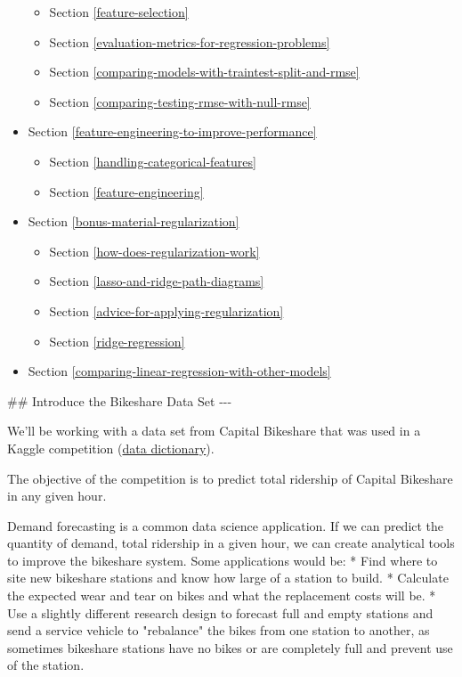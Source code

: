 \documentclass[11pt]{article}
\providecommand{\tightlist}{%
      \setlength{\itemsep}{0pt}\setlength{\parskip}{0pt}}
\begin{document}
\begin{itemize}
  \begin{itemize}
  \tightlist
  \item
    Section \ref{feature-selection}
  \item
    Section \ref{evaluation-metrics-for-regression-problems}
  \item
    Section \ref{comparing-models-with-traintest-split-and-rmse}
  \item
    Section \ref{comparing-testing-rmse-with-null-rmse}
  \end{itemize}
\item
  Section \ref{feature-engineering-to-improve-performance}

  \begin{itemize}
  \tightlist
  \item
    Section \ref{handling-categorical-features}
  \item
    Section \ref{feature-engineering}
  \end{itemize}
\item
  Section \ref{bonus-material-regularization}

  \begin{itemize}
  \tightlist
  \item
    Section \ref{how-does-regularization-work}
  \item
    Section \ref{lasso-and-ridge-path-diagrams}
  \item
    Section \ref{advice-for-applying-regularization}
  \item
    Section \ref{ridge-regression}
  \end{itemize}
\item
  Section \ref{comparing-linear-regression-with-other-models}
\end{itemize}

     \#\# Introduce the Bikeshare Data Set -\/-\/-

    We'll be working with a data set from Capital Bikeshare that was used in
a Kaggle competition
(\href{https://www.kaggle.com/c/bike-sharing-demand/data}{data
dictionary}).

The objective of the competition is to predict total ridership of
Capital Bikeshare in any given hour.

Demand forecasting is a common data science application. If we can
predict the quantity of demand, total ridership in a given hour, we can
create analytical tools to improve the bikeshare system. Some
applications would be: * Find where to site new bikeshare stations and
know how large of a station to build. * Calculate the expected wear and
tear on bikes and what the replacement costs will be. * Use a slightly
different research design to forecast full and empty stations and send a
service vehicle to "rebalance" the bikes from one station to another, as
sometimes bikeshare stations have no bikes or are completely full and
prevent use of the station.
\end{document}
